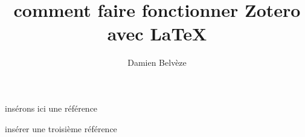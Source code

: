 \documentclass[12pt]{article}
\title{comment faire fonctionner Zotero avec LaTeX}
\author{Damien Belvèze}
\begin{document}
\maketitle

insérons ici une référence \cite{claveyMastodonRefugePour2023}


insérer une troisième référence \cite{strantzaliEvaluationFutureSustainable2017}

\printbibliography
\end{document}
